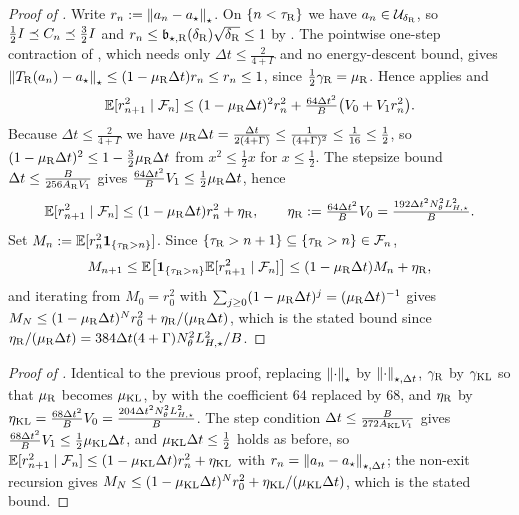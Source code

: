 \begin{proof}[Proof of ]
Write $r_n:=\left\lVert a_n-a_\star\right\rVert_\star$. On $\{n<\tau_{\mathrm{R}}\}$ we have $a_n\in\mathcal{U}_{\delta_{\mathrm{R}}}$,
so $\tfrac12I\preceq C_n\preceq\tfrac32I$ and
$r_n\leq\mathfrak b_{\star,\mathrm{R}}(\delta_{\mathrm{R}})\sqrt{\delta_{\mathrm{R}}}\leq1$ by
. The pointwise one-step contraction of , which
needs only $\Delta t\leq\tfrac2{4+\Gamma}$ and no energy-descent bound, gives
$\left\lVert T_{\mathrm{R}}(a_n)-a_\star\right\rVert_\star\leq(1-\mu_{\mathrm{R}}\Delta t)r_n\leq r_n\leq1$, since
$\tfrac12\gamma_{\mathrm{R}}=\mu_{\mathrm{R}}$. Hence  applies and
\[
    \mathbb{E}[r_{n+1}^2\mid\mathcal{F}_n]\leq(1-\mu_{\mathrm{R}}\Delta t)^2r_n^2+\tfrac{64\Delta t^2}B\bigl(V_0+V_1r_n^2\bigr).
\]
Because $\Delta t\leq\tfrac2{4+\Gamma}$ we have
$\mu_{\mathrm{R}}\Delta t=\tfrac{\Delta t}{2(4+\Gamma)}\leq\tfrac1{(4+\Gamma)^2}\leq\tfrac1{16}\leq\tfrac12$,
so $(1-\mu_{\mathrm{R}}\Delta t)^2\leq1-\tfrac32\mu_{\mathrm{R}}\Delta t$ from $x^2\leq\tfrac12x$ for
$x\leq\tfrac12$. The stepsize bound $\Delta t\leq\tfrac B{256A_{\mathrm{R}}V_1}$ gives
$\tfrac{64\Delta t^2}BV_1\leq\tfrac12\mu_{\mathrm{R}}\Delta t$, hence
\[
    \mathbb{E}[r_{n+1}^2\mid\mathcal{F}_n]\leq(1-\mu_{\mathrm{R}}\Delta t)r_n^2+\eta_{\mathrm{R}},
    \qquad \eta_{\mathrm{R}}:=\tfrac{64\Delta t^2}BV_0=\tfrac{192\Delta t^2N_\theta^2L_{H,\star}^2}B .
\]
Set $M_n:=\mathbb{E}[r_n^2\mathbf1_{\{\tau_{\mathrm{R}}>n\}}]$. Since
$\{\tau_{\mathrm{R}}>n+1\}\subseteq\{\tau_{\mathrm{R}}>n\}\in\mathcal{F}_n$,
\[
    M_{n+1}\leq\mathbb{E}\bigl[\mathbf1_{\{\tau_{\mathrm{R}}>n\}}\mathbb{E}[r_{n+1}^2\mid\mathcal{F}_n]\bigr]
    \leq(1-\mu_{\mathrm{R}}\Delta t)M_n+\eta_{\mathrm{R}},
\]
and iterating from $M_0=r_0^2$ with $\sum_{j\geq0}(1-\mu_{\mathrm{R}}\Delta t)^j=(\mu_{\mathrm{R}}\Delta t)^{-1}$
gives
$M_N\leq(1-\mu_{\mathrm{R}}\Delta t)^Nr_0^2+\eta_{\mathrm{R}}/(\mu_{\mathrm{R}}\Delta t)$, which is the stated bound
since $\eta_{\mathrm{R}}/(\mu_{\mathrm{R}}\Delta t)=384\Delta t(4+\Gamma)N_\theta^2L_{H,\star}^2/B$.
\end{proof}

\begin{proof}[Proof of ]
Identical to the previous proof, replacing $\left\lVert \cdot\right\rVert_\star$ by $\left\lVert \cdot\right\rVert_{\star,\Delta t}$,
$\gamma_{\mathrm{R}}$ by $\gamma_{\mathrm{KL}}$ so that $\mu_{\mathrm{R}}$ becomes $\mu_{\mathrm{KL}}$,
 by  with the coefficient $64$ replaced by $68$, and
$\eta_{\mathrm{R}}$ by $\eta_{\mathrm{KL}}=\tfrac{68\Delta t^2}BV_0=\tfrac{204\Delta t^2N_\theta^2L_{H,\star}^2}B$. The
step condition $\Delta t\leq\tfrac B{272A_{\mathrm{KL}}V_1}$ gives
$\tfrac{68\Delta t^2}BV_1\leq\tfrac12\mu_{\mathrm{KL}}\Delta t$, and $\mu_{\mathrm{KL}}\Delta t\leq\tfrac12$ holds as
before, so $\mathbb{E}[r_{n+1}^2\mid\mathcal{F}_n]\leq(1-\mu_{\mathrm{KL}}\Delta t)r_n^2+\eta_{\mathrm{KL}}$ with
$r_n=\left\lVert a_n-a_\star\right\rVert_{\star,\Delta t}$; the non-exit recursion gives
$M_N\leq(1-\mu_{\mathrm{KL}}\Delta t)^Nr_0^2+\eta_{\mathrm{KL}}/(\mu_{\mathrm{KL}}\Delta t)$, which is the stated bound.
\end{proof}

